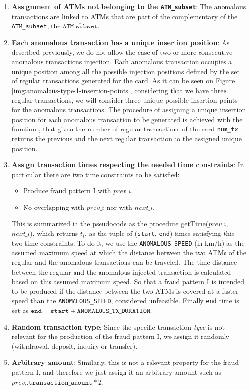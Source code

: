 \begin{enumerate}
  \item \textbf{Assignment of ATMs not belonging to the \texttt{ATM\_subset}}: The anomalous transactions are linked to ATMs that are part of the complementary of the \texttt{ATM\_subset}, the $\overline{\texttt{ATM\_subset}}$.
  \item \textbf{Each anomalous transaction has a unique insertion position}: As described previously, we do not allow the case of two or more consecutive anomalous transactions injection. Each anomalous transaction occupies a unique position among all the possible injection positions defined by the set of regular transactions generated for the card. As it can be seen on Figure \ref{img:anomalous-type-1-insertion-points}, considering that we have three regular transactions, we will consider three unique possible insertion points for the anomalous transactions. The procedure of assigning a unique insertion position for each anomalous transaction to be generated is achieved with the function , that given the number of regular transactions of the card \texttt{num\_tx} returns the previous and the next regular transaction to the assigned unique position.
  \item \textbf{Assign transaction times respecting the needed time constraints}: In particular there are two time constraints to be satisfied:
  \begin{itemize}
    \item Produce fraud pattern I with $prev\_i$.
    \item No overlapping with $prev\_i$ nor with $next\_i$.
  \end{itemize}
  This is summarized in the pseudocode as the procedure getTime($prev\_i$, $next\_i$), which returns $t_i$, as the tuple of (\texttt{start}, \texttt{end}) times satisfying this two time constraints. To do it, we use the \texttt{ANOMALOUS\_SPEED} (in km/h) as the assumed maximum speed at which the distance between the two ATMs of the regular and the anomalous transactions can be traveled. The time distance between the regular and the anomalous injected transaction is calculated based on this assumed maximum speed. So that a fraud pattern I is intended to be produced if the distance between the two ATMs is covered at a faster speed than the \texttt{ANOMALOUS\_SPEED}, considered unfeasible. Finally \texttt{end} time is set as $\texttt{end} = \texttt{start} + \texttt{ANOMALOUS\_TX\_DURATION}$.
  \item \textbf{Random transaction type}: Since the specific transaction \emph{type} is not relevant for the production of the fraud pattern I, we assign it randomly (withdrawal, deposit, inquiry or transfer).
  \item \textbf{Arbitrary amount}: Similarly, this is not a relevant property for the fraud pattern I, and therefore we just assign it an arbitrary amount such as $prev_i.\texttt{transaction\_amount} * 2$.
\end{enumerate}


